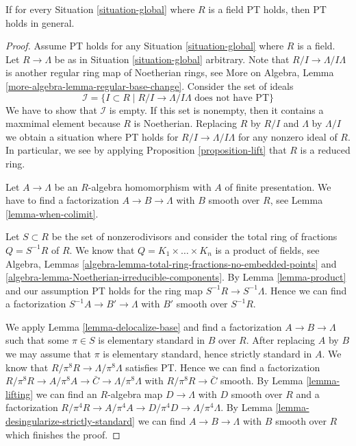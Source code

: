 \begin{lemma}
\label{lemma-reduce-to-field}
If for every Situation \ref{situation-global} where $R$
is a field PT holds, then PT holds in general.
\end{lemma}

\begin{proof}
Assume PT holds for any Situation \ref{situation-global} where $R$ is a field.
Let $R \to \Lambda$ be as in Situation \ref{situation-global} arbitrary.
Note that $R/I \to \Lambda/I\Lambda$ is another regular ring map
of Noetherian rings, see
More on Algebra, Lemma \ref{more-algebra-lemma-regular-base-change}.
Consider the set of ideals
$$
\mathcal{I} = \{I \subset R \mid R/I \to \Lambda/I\Lambda
\text{ does not have PT}\}
$$
We have to show that $\mathcal{I}$ is empty. If this set is nonempty,
then it contains a maxmimal element because $R$ is Noetherian.
Replacing $R$ by $R/I$ and $\Lambda$ by $\Lambda/I$ we obtain a
situation where PT holds for $R/I \to \Lambda/I\Lambda$ for any
nonzero ideal of $R$. In particular, we see by applying
Proposition \ref{proposition-lift}
that $R$ is a reduced ring.

\medskip\noindent
Let $A \to \Lambda$ be an $R$-algebra homomorphism with $A$ of
finite presentation. We have to find a factorization $A \to B \to \Lambda$
with $B$ smooth over $R$, see Lemma \ref{lemma-when-colimit}.

\medskip\noindent
Let $S \subset R$ be the set of nonzerodivisors and
consider the total ring of fractions $Q = S^{-1}R$ of $R$. We know that
$Q = K_1 \times \ldots \times K_n$ is a product of fields, see
Algebra, Lemmas \ref{algebra-lemma-total-ring-fractions-no-embedded-points} and
\ref{algebra-lemma-Noetherian-irreducible-components}.
By Lemma \ref{lemma-product} and our assumption
PT holds for the ring map $S^{-1}R \to S^{-1}\Lambda$.
Hence we can find a factorization $S^{-1}A \to B' \to \Lambda$
with $B'$ smooth over $S^{-1}R$.

\medskip\noindent
We apply Lemma \ref{lemma-delocalize-base}
and find a factorization $A \to B \to \Lambda$ such that
some $\pi \in S$ is elementary standard in $B$ over $R$.
After replacing $A$ by $B$ we may assume that $\pi$ is
elementary standard, hence strictly standard in $A$. We know that
$R/\pi^8R \to \Lambda/\pi^8\Lambda$ satisfies PT.
Hence we can find a factorization
$R/\pi^8 R \to A/\pi^8A \to \bar C \to \Lambda/\pi^8\Lambda$
with $R/\pi^8 R \to \bar C$ smooth. By
Lemma \ref{lemma-lifting}
we can find an $R$-algebra map $D \to \Lambda$ with $D$ smooth over $R$
and a factorization
$R/\pi^4 R \to A/\pi^4A \to D/\pi^4D \to \Lambda/\pi^4\Lambda$.
By Lemma \ref{lemma-desingularize-strictly-standard}
we can find $A \to B \to \Lambda$ with $B$ smooth over $R$
which finishes the proof.
\end{proof}










